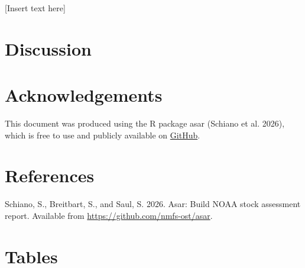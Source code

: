 \documentclass[
  letterpaper,
]{article}
\newlength{\cslhangindent}
\newenvironment{CSLReferences}[2] %
 {\begin{list}{}{%
  \setlength{\itemindent}{0pt}
  \setlength{\leftmargin}{0pt}
  \setlength{\parsep}{0pt}
  \ifodd #1
   \setlength{\leftmargin}{\cslhangindent}
   \setlength{\itemindent}{-1\cslhangindent}
  \fi
  \setlength{\itemsep}{#2\baselineskip}}}
 {\end{list}}
\begin{document}
{[}Insert text here{]}

\newpage{}

\section{Discussion}\label{sec-discussion}

\newpage{}

\section{Acknowledgements}\label{sec-acknowledgements}

This document was produced using the R package asar (Schiano et al.
2026), which is free to use and publicly available on
\href{https://github.com/nmfs-ost/asar}{GitHub}.

\newpage{}

\section{References}\label{sec-refs}

\protect{}\label{refs}
\begin{CSLReferences}{1}{0}
Schiano, S., Breitbart, S., and Saul, S. 2026. Asar: Build NOAA stock
assessment report. Available from
\url{https://github.com/nmfs-ost/asar}.

\end{CSLReferences}

\newpage{}

\section{Tables}\label{sec-tables}
\end{document}
